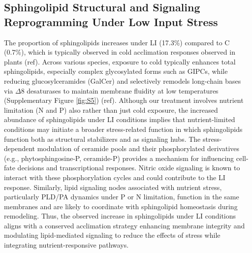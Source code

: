 \documentclass[10pt,letterpaper]{article}
\begin{document}
\begin{itemize}
\subsection*{Sphingolipid Structural and Signaling Reprogramming Under Low Input Stress}
The proportion of sphingolipids increases under LI (17.3\%) compared to C (0.7\%), which is typically observed in cold acclimation responses observed in plants (ref). Across various species, exposure to cold typically enhances total sphingolipids, especially complex glycosylated forms such as GIPCs, while reducing glucosylceramides (GalCer) and selectively remodels long-chain bases via $\Delta$8 desaturases to maintain membrane fluidity at low temperatures (Supplementary Figure \ref{fig:S5}) (ref). Although our treatment involves nutrient limitation (N and P) also rather than just cold exposure, the increased abundance of sphingolipids under LI conditions implies that nutrient-limited conditions may initiate a broader stress-related function in which sphingolipids function both as structural stabilizers and as signaling hubs. The stress-dependent modulation of ceramide pools and their phosphorylated derivatives (e.g., phytosphingosine-P, ceramide-P) provides a mechanism for influencing cell-fate decisions and transcriptional responses. Nitric oxide signaling is known to interact with these phosphorylation cycles and could contribute to the LI response. Similarly, lipid signaling nodes associated with nutrient stress, particularly PLD/PA dynamics under P or N limitation, function in the same membranes and are likely to coordinate with sphingolipid homeostasis during remodeling. Thus, the observed increase in sphingolipids under LI conditions aligns with a conserved acclimation strategy enhancing membrane integrity and modulating lipid-mediated signaling to reduce the effects of stress while integrating nutrient-responsive pathways. 


\end{itemize}
\end{document}
